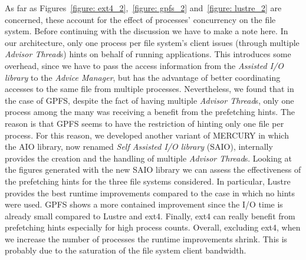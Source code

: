 As far as Figures~\ref{figure: ext4_2},~\ref{figure: gpfs_2} and~\ref{figure: lustre_2} are concerned, these account for the effect of processes' concurrency on the file system. Before continuing with the discussion we have to make a note here. In our architecture, only one process per file system's client issues (through multiple \textit{Advisor Thread}s) hints on behalf of running applications. This introduces some overhead, since we have to pass the access information from the \textit{Assisted I/O library} to the \textit{Advice Manager}, but has the advantage of better coordinating accesses to the same file from multiple processes. Nevertheless, we found that in the case of GPFS, despite the fact of having multiple \textit{Advisor Thread}s, only one process among the many was receiving a benefit from the prefetching hints. The reason is that GPFS seems to have the restriction of hinting only one file per process. For this reason, we developed another variant of MERCURY in which the AIO library, now renamed \textit{Self Assisted I/O library} (SAIO), internally provides the creation and the handling of multiple \textit{Advisor Thread}s. Looking at the figures generated with the new SAIO library we can assess the effectiveness of the prefetching hints for the three file systems considered. In particular, Lustre provides the best runtime improvements compared to the case in which no hints were used. GPFS shows a more contained improvement since the I/O time is already small compared to Lustre and ext4. Finally, ext4 can really benefit from prefetching hints especially for high process counts. Overall, excluding ext4, when we increase the number of processes the runtime improvements shrink. This is probably due to the saturation of the file system client bandwidth.


